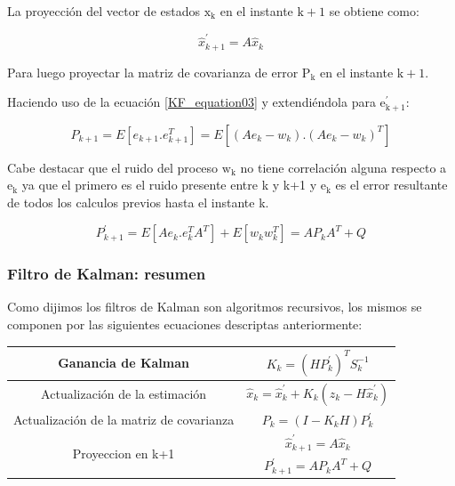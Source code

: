 \documentclass[10pt,a4paper]{article}
\begin{document}
\noindent La proyección del vector de estados $\mathrm{x_k}$ en el instante 
$\mathrm{k+1}$ se obtiene como:

\begin{equation}
    \hat{x}^\prime_{k+1} = A \hat{x}_k 
    \label{x_k_projection}
\end{equation}	

\noindent Para luego proyectar la matriz de covarianza de error
$\mathrm{P_k}$ en el instante $\mathrm{k+1}$.

\noindent Haciendo uso de la ecuación \ref{KF_equation03} y extendiéndola 
para $\mathrm{e^\prime_{k+1}}$:

\begin{equation}
    P_{k+1} = E[e_{k+1}.e_{k+1}^{T}] = E[(A e_k-w_k).(A  e_k-w_k)^{T}]
    \label{projection_p_k_aux}
\end{equation}	

\noindent Cabe destacar que el ruido del proceso $\mathrm{w_k}$ no tiene 
correlación alguna respecto a $\mathrm{e_k}$ ya que el primero es el ruido 
presente entre k y k+1 y $\mathrm{e_k}$ es el error resultante de todos los 
calculos previos hasta el instante k.

\begin{equation}
    P^\prime_{k+1} = E[A e_{k}.e_{k}^{T}A^{T}]+ E[w_k w_k^{T}]= A P_k A^{T} + Q
    \label{projection_p_k}
\end{equation}	

\subsubsection{Filtro de Kalman: resumen}

Como dijimos los filtros de Kalman son algoritmos recursivos, los mismos se
componen por las siguientes ecuaciones descriptas anteriormente:

\begin{table}[h!]
    \centering
    \begin{tabular}{|c|c|}
	\hline
	\rule{0pt}{4ex}	Ganancia de Kalman 							& $K_k = (H P^\prime_k)^T S_k^{-1}$  \\ \hline
	\rule{0pt}{4ex}	Actualización de la estimación			    &  $\hat{x}_k = \hat{x}^\prime_k + K_k (z_k - H\hat{x}^\prime_k)$\\ \hline
	\rule{0pt}{4ex}	Actualización de la matriz de covarianza    & $P_k = (I - K_k H) P^\prime_k$ \\ \hline
	\multirow{2}{*}{Proyeccion en k+1}        		  			& \rule{0pt}{4ex} $\hat{x}^\prime_{k+1} = A \hat{x}_k$ \\ \cline{2-2}
	& \rule{0pt}{4ex} $P^\prime_{k+1} = A P_k A^{T} + Q$ \\ \hline
    \end{tabular}
    \label{Ecuaciones_Kalman}
\end{table}
\end{document}
